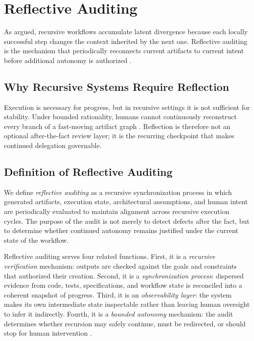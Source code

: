 \section{Reflective Auditing}
\label{sec:reflective-auditing}

As  argued, recursive workflows accumulate latent divergence because each locally successful step changes the context inherited by the next one. Reflective auditing is the mechanism that periodically reconnects current artifacts to current intent before additional autonomy is authorized \cite{Wiener1948Cybernetics,Beer1972BrainFirm}.

\subsection{Why Recursive Systems Require Reflection}

Execution is necessary for progress, but in recursive settings it is not sufficient for stability. Under bounded rationality, humans cannot continuously reconstruct every branch of a fast-moving artifact graph \cite{Simon1957ModelsMan,Sweller1988CognitiveLoad}. Reflection is therefore not an optional after-the-fact review layer; it is the recurring checkpoint that makes continued delegation governable.

\subsection{Definition of Reflective Auditing}

We define \textit{reflective auditing} as a recursive synchronization process in which generated artifacts, execution state, architectural assumptions, and human intent are periodically evaluated to maintain alignment across recursive execution cycles. The purpose of the audit is not merely to detect defects after the fact, but to determine whether continued autonomy remains justified under the current state of the workflow.

Reflective auditing serves four related functions. First, it is a \textit{recursive verification} mechanism: outputs are checked against the goals and constraints that authorized their creation. Second, it is a \textit{synchronization process}: dispersed evidence from code, tests, specifications, and workflow state is reconciled into a coherent snapshot of progress. Third, it is an \textit{observability layer}: the system makes its own intermediate state inspectable rather than leaving human oversight to infer it indirectly. Fourth, it is a \textit{bounded autonomy} mechanism: the audit determines whether recursion may safely continue, must be redirected, or should stop for human intervention \cite{Amershi2014InteractiveML,Shneiderman2020HCAI}.

